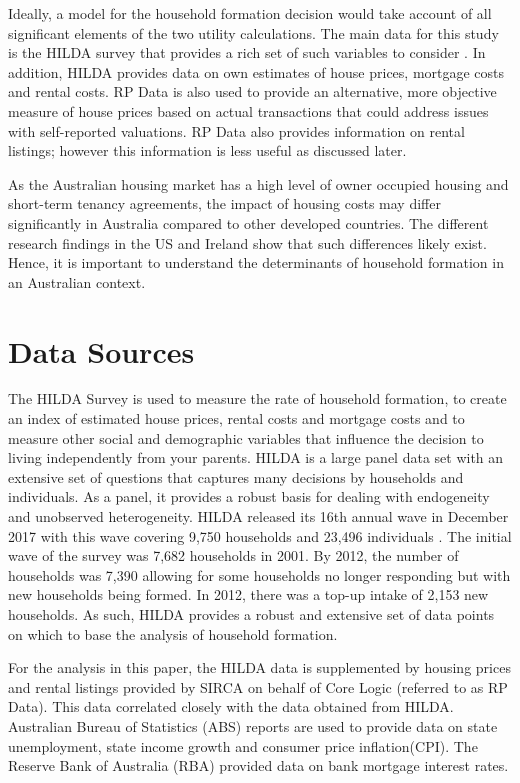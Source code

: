\documentclass[12pt]{article}
\begin{document}
Ideally, a model for the household formation decision would take account of all significant elements of the two utility calculations. The main data for this study is the HILDA survey that provides a rich set of such variables to consider \parencite{HILDA2017Manual}. In addition, HILDA provides data on own estimates of house prices, mortgage costs and rental costs. RP Data is also used to provide an alternative, more objective measure of house prices based on actual transactions that could address issues with self-reported valuations. RP Data also provides information on rental listings; however this information is less useful as discussed later.

As the Australian housing market has a high level of owner occupied housing and short-term tenancy agreements, the impact of housing costs may differ significantly in Australia compared to other developed countries. The different research findings in the US and Ireland show that such differences likely exist. Hence, it is important to understand the determinants of household formation in an Australian context.

\section{Data Sources}

The HILDA Survey is used to measure the rate of household formation, to create an index of estimated house prices, rental costs and mortgage costs and to measure other social and demographic variables that influence the decision to living independently from your parents. HILDA is a large panel data set with an extensive set of questions that captures many decisions by households and individuals. As a panel, it provides a robust basis for dealing with endogeneity and unobserved heterogeneity. HILDA released its 16th annual wave in December 2017 with this wave covering 9,750 households and 23,496 individuals \parencite{HILDA2017Manual}. The initial wave of the survey was 7,682 households in 2001. By 2012, the number of households was 7,390 allowing for some households no longer responding but with new households being formed. In 2012, there was a top-up intake of 2,153 new households. As such, HILDA provides a robust and extensive set of data points on which to base the analysis of household formation.

For the analysis in this paper, the HILDA data is supplemented by housing prices and rental listings provided by SIRCA on behalf of Core Logic (referred to as RP Data). This data correlated closely with the data obtained from HILDA. Australian Bureau of Statistics (ABS) reports are used to provide data on state unemployment, state income growth and consumer price inflation(CPI). The Reserve Bank of Australia (RBA) provided data on bank mortgage interest rates.
\end{document}
